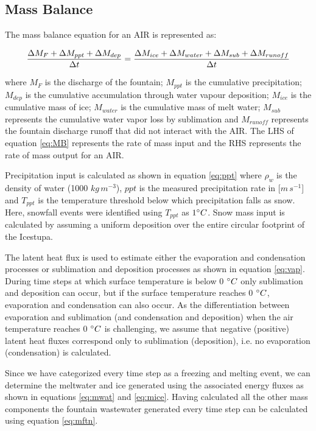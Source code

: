 \documentclass[utf8]{frontiersSCNS} %
\begin{document}
\subsection{Mass Balance} 
The mass balance equation for an AIR is represented as:

\begin{equation}
    \frac{\Delta M_{F} + \Delta M_{ppt} + \Delta M_{dep}}{\Delta t} = \frac{\Delta M_{ice} +\Delta M_{water} +
    \Delta M_{sub} + \Delta M_{runoff}}{\Delta t}  \\
    \label{eq:MB} 
\end{equation}

where $M_{F}$ is the discharge of the fountain; $M_{ppt}$ is the cumulative precipitation;  $M_{dep}$ is the cumulative
accumulation through water vapour deposition; $M_{ice}$ is the cumulative mass of ice; $M_{water}$ is the cumulative
mass of melt water; $M_{sub}$ represents the cumulative water vapor loss by sublimation and $M_{runoff}$ represents the
fountain discharge runoff that did not interact with the AIR. The LHS of equation \ref{eq:MB} represents the rate of
mass input and the RHS represents the rate of mass output for an AIR. 

Precipitation input is calculated as shown in equation \ref{eq:ppt} where $\rho_{w}$ is the density of water (1000
$kg\,m^{-3}$), $ppt$ is the measured precipitation rate in [$m\,s^{-1}$] and $T_{ppt}$ is the temperature threshold
below which precipitation falls as snow. Here, snowfall events were identified using $T_{ppt}$ as $1 \degree C$. Snow
mass input is calculated by assuming a uniform deposition over the entire circular footprint of the Icestupa. 

The latent heat flux is used to estimate either the evaporation and condensation processes or sublimation and deposition
processes as shown in equation \ref{eq:vap}. During time steps at which surface temperature is below 0 $\degree C$ only
sublimation and deposition can occur, but if the surface temperature reaches 0 $\degree C$, evaporation and condensation
can also occur. As the differentiation between evaporation and sublimation (and condensation and deposition) when the
air temperature reaches 0 $\degree C$ is challenging, we assume that negative (positive) latent heat fluxes correspond
only to sublimation (deposition), i.e. no evaporation (condensation) is calculated.

Since we have categorized every time step as a freezing and melting event, we can determine the meltwater and  ice
generated using the associated energy fluxes as shown in equations \ref{eq:mwat} and \ref{eq:mice}. Having
calculated all the other mass components the fountain wastewater generated every time step can be calculated using
equation \ref{eq:mftn}.
\end{document}

